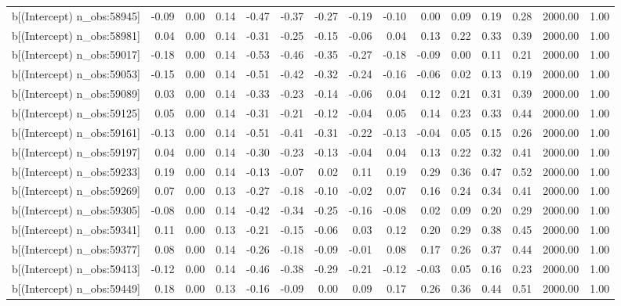 \begin{table}[ht]
\begin{tabular}{rrrrrrrrrrrrrrr}
  b[(Intercept) n\_obs:58945] & -0.09 & 0.00 & 0.14 & -0.47 & -0.37 & -0.27 & -0.19 & -0.10 & 0.00 & 0.09 & 0.19 & 0.28 & 2000.00 & 1.00 \\ 
  b[(Intercept) n\_obs:58981] & 0.04 & 0.00 & 0.14 & -0.31 & -0.25 & -0.15 & -0.06 & 0.04 & 0.13 & 0.22 & 0.33 & 0.39 & 2000.00 & 1.00 \\ 
  b[(Intercept) n\_obs:59017] & -0.18 & 0.00 & 0.14 & -0.53 & -0.46 & -0.35 & -0.27 & -0.18 & -0.09 & 0.00 & 0.11 & 0.21 & 2000.00 & 1.00 \\ 
  b[(Intercept) n\_obs:59053] & -0.15 & 0.00 & 0.14 & -0.51 & -0.42 & -0.32 & -0.24 & -0.16 & -0.06 & 0.02 & 0.13 & 0.19 & 2000.00 & 1.00 \\ 
  b[(Intercept) n\_obs:59089] & 0.03 & 0.00 & 0.14 & -0.33 & -0.23 & -0.14 & -0.06 & 0.04 & 0.12 & 0.21 & 0.31 & 0.39 & 2000.00 & 1.00 \\ 
  b[(Intercept) n\_obs:59125] & 0.05 & 0.00 & 0.14 & -0.31 & -0.21 & -0.12 & -0.04 & 0.05 & 0.14 & 0.23 & 0.33 & 0.44 & 2000.00 & 1.00 \\ 
  b[(Intercept) n\_obs:59161] & -0.13 & 0.00 & 0.14 & -0.51 & -0.41 & -0.31 & -0.22 & -0.13 & -0.04 & 0.05 & 0.15 & 0.26 & 2000.00 & 1.00 \\ 
  b[(Intercept) n\_obs:59197] & 0.04 & 0.00 & 0.14 & -0.30 & -0.23 & -0.13 & -0.04 & 0.04 & 0.13 & 0.22 & 0.32 & 0.41 & 2000.00 & 1.00 \\ 
  b[(Intercept) n\_obs:59233] & 0.19 & 0.00 & 0.14 & -0.13 & -0.07 & 0.02 & 0.11 & 0.19 & 0.29 & 0.36 & 0.47 & 0.52 & 2000.00 & 1.00 \\ 
  b[(Intercept) n\_obs:59269] & 0.07 & 0.00 & 0.13 & -0.27 & -0.18 & -0.10 & -0.02 & 0.07 & 0.16 & 0.24 & 0.34 & 0.41 & 2000.00 & 1.00 \\ 
  b[(Intercept) n\_obs:59305] & -0.08 & 0.00 & 0.14 & -0.42 & -0.34 & -0.25 & -0.16 & -0.08 & 0.02 & 0.09 & 0.20 & 0.29 & 2000.00 & 1.00 \\ 
  b[(Intercept) n\_obs:59341] & 0.11 & 0.00 & 0.13 & -0.21 & -0.15 & -0.06 & 0.03 & 0.12 & 0.20 & 0.29 & 0.38 & 0.45 & 2000.00 & 1.00 \\ 
  b[(Intercept) n\_obs:59377] & 0.08 & 0.00 & 0.14 & -0.26 & -0.18 & -0.09 & -0.01 & 0.08 & 0.17 & 0.26 & 0.37 & 0.44 & 2000.00 & 1.00 \\ 
  b[(Intercept) n\_obs:59413] & -0.12 & 0.00 & 0.14 & -0.46 & -0.38 & -0.29 & -0.21 & -0.12 & -0.03 & 0.05 & 0.16 & 0.23 & 2000.00 & 1.00 \\ 
  b[(Intercept) n\_obs:59449] & 0.18 & 0.00 & 0.13 & -0.16 & -0.09 & 0.00 & 0.09 & 0.17 & 0.26 & 0.36 & 0.44 & 0.51 & 2000.00 & 1.00 \\ 

\end{tabular}
\end{table}
